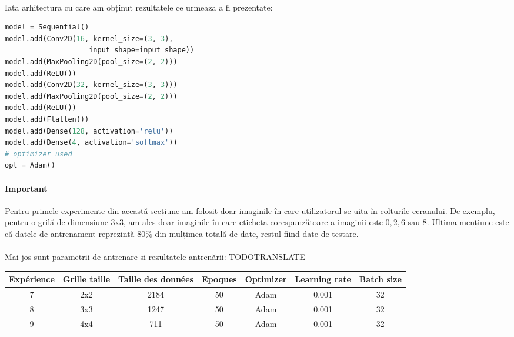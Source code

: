 \paragraph{}
Iată arhitectura cu care am obținut rezultatele ce urmează a fi prezentate:

\label{cnn_first_architecture}
\begin{lstlisting}[language=Python, caption=Prima arhitectură CNN]
model = Sequential()
model.add(Conv2D(16, kernel_size=(3, 3),
                    input_shape=input_shape))
model.add(MaxPooling2D(pool_size=(2, 2)))
model.add(ReLU())
model.add(Conv2D(32, kernel_size=(3, 3)))
model.add(MaxPooling2D(pool_size=(2, 2)))
model.add(ReLU())
model.add(Flatten())
model.add(Dense(128, activation='relu'))
model.add(Dense(4, activation='softmax'))
# optimizer used
opt = Adam()
\end{lstlisting}

\paragraph{Important}
Pentru primele experimente din această secțiune am folosit doar imaginile în care utilizatorul se uita în colțurile ecranului.
De exemplu, pentru o grilă de dimensiune 3x3, am ales doar imaginile în care eticheta corespunzătoare a imaginii este $0, 2, 6$ sau $8$.
Ultima mențiune este că datele de antrenament reprezintă $80\%$ din mulțimea totală de date, restul fiind date de testare.

\paragraph{}
Mai jos sunt parametrii de antrenare și rezultatele antrenării:
TODOTRANSLATE

\begin{center}
    \begin{tabular}{ c | c | c | c | c | c | c }
        \hline
        Expérience & Grille taille & Taille des données & Epoques & Optimizer & Learning rate & Batch size \\ 
        \hline
        7 & 2x2 & 2184 & 50 & Adam & 0.001 & 32 \\
        \hline
        8 & 3x3 & 1247 & 50 & Adam & 0.001 & 32 \\
        \hline
        9 & 4x4 & 711 & 50 & Adam & 0.001 & 32 \\
        \hline
    \end{tabular}
\end{center}

